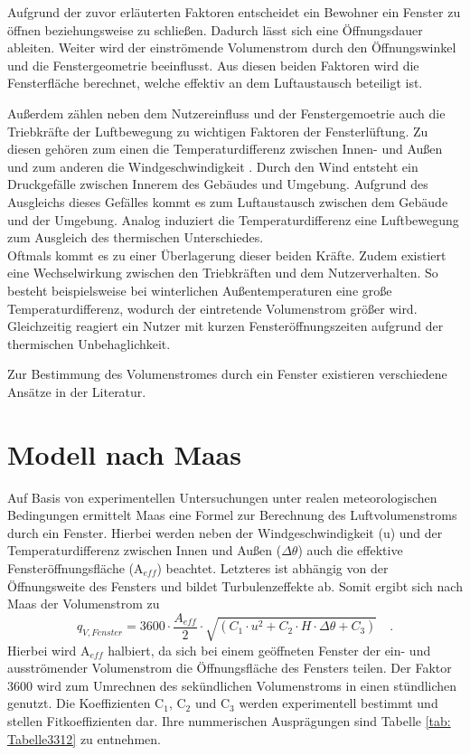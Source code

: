 Aufgrund der zuvor erläuterten Faktoren entscheidet ein Bewohner ein Fenster zu öffnen beziehungsweise zu schließen.
Dadurch lässt sich eine Öffnungsdauer ableiten.
Weiter wird der einströmende Volumenstrom durch den Öffnungswinkel und die Fenstergeometrie beeinflusst.
Aus diesen beiden Faktoren wird die Fensterfläche berechnet, welche effektiv an dem Luftaustausch beteiligt ist.\cite{Hall.2004}

Außerdem zählen neben dem Nutzereinfluss und der Fenstergemoetrie auch die Triebkräfte der Luftbewegung zu wichtigen Faktoren der Fensterlüftung.
Zu diesen gehören zum einen die Temperaturdifferenz zwischen Innen- und Außen und zum anderen die Windgeschwindigkeit \cite{Schild.2013b}.
Durch den Wind entsteht ein Druckgefälle zwischen Innerem des Gebäudes und Umgebung.
Aufgrund des Ausgleichs dieses Gefälles kommt es zum Luftaustausch zwischen dem Gebäude und der Umgebung.
Analog induziert die Temperaturdifferenz eine Luftbewegung zum Ausgleich des thermischen Unterschiedes. \cite{Maas.2017} \\
Oftmals kommt es zu einer Überlagerung dieser beiden Kräfte.
Zudem existiert eine Wechselwirkung zwischen den Triebkräften und dem Nutzerverhalten.
So besteht beispielsweise bei winterlichen Außentemperaturen eine große Temperaturdifferenz, wodurch der eintretende Volumenstrom größer wird.
Gleichzeitig reagiert ein Nutzer mit kurzen Fensteröffnungszeiten aufgrund der thermischen Unbehaglichkeit. 

Zur Bestimmung des Volumenstromes durch ein Fenster existieren verschiedene Ansätze in der Literatur.

\section*{Modell nach Maas}
Auf Basis von experimentellen Untersuchungen unter realen meteorologischen Bedingungen ermittelt Maas \cite{Maas.1995} eine Formel zur Berechnung des Luftvolumenstroms durch ein Fenster.
Hierbei werden neben der Windgeschwindigkeit (u) und der Temperaturdifferenz zwischen Innen und Außen (\(\Delta \theta\)) auch die effektive Fensteröffnungsfläche (A\(_{eff}\)) beachtet. 
Letzteres ist abhängig von der Öffnungsweite des Fensters und bildet Turbulenzeffekte ab.
Somit ergibt sich nach Maas der Volumenstrom zu
\begin{equation}
\label{eq:Gleichung3311}
q_{V, Fenster} = 3600 \cdot \frac{A_{eff}}{2} \cdot \sqrt{(C_1 \cdot u^2 + C_2 \cdot H \cdot \Delta \theta + C_3)} \quad \text{.}
\end{equation}
Hierbei wird A\(_{eff}\) halbiert, da sich bei einem geöffneten Fenster der ein- und ausströmender Volumenstrom die Öffnungsfläche des Fensters teilen.
Der Faktor 3600 wird zum Umrechnen des sekündlichen Volumenstroms in einen stündlichen genutzt.
Die Koeffizienten C\(_1\), C\(_2\) und C\(_3\) werden experimentell bestimmt und stellen Fitkoeffizienten dar.
Ihre nummerischen Ausprägungen sind Tabelle \ref{tab: Tabelle3312} zu entnehmen.

